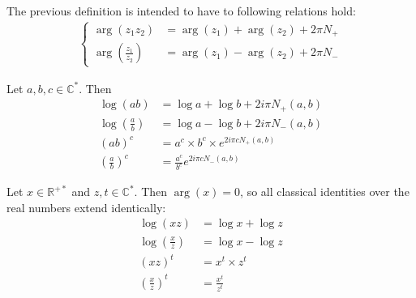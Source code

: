 \documentclass[../main.tex]{subfiles}
\begin{document}
\begin{remark}
	The previous definition is intended to have to following relations hold:
	\begin{align*}
	\begin{cases}
	\arg(z_1 z_2) &= \arg (z_1) + \arg (z_2) + 2\pi N_+\\
	\arg \left(\frac{z_1}{z_2}\right) &= \arg (z_1) - \arg (z_2) + 2\pi N_-
	\end{cases}
	\end{align*}
\end{remark}

\begin{thm}{}
	Let $a, b, c \in \mathbb{C}^*$. Then
	\begin{align*}
		\log (a b) &= \log a + \log b + 2 i \pi N_+ (a, b)\\
		\log \left(\frac{a}{b}\right) &=  \log a - \log b + 2 i \pi N_- (a, b)\\
		{(a b)}^c &= a^c \times b^c \times e^{2i\pi c N_+(a, b)}\\
		{\left(\frac{a}{b}\right)}^c &= \frac{a^c}{b^c} e^{2i\pi c N_-(a, b)}
	\end{align*}
\end{thm}

\begin{cor}{}\label{cor_log_identities}
	Let $x \in \mathbb{R}^{+*}$ and $z,t \in \mathbb{C}^*$. Then $\arg(x) = 0$, so all classical identities over the real numbers extend identically:
	\begin{align*}
	\log (xz) &= \log x + \log z\\
	\log \left(\frac{x}{z}\right) &=  \log x - \log z\\
	{(x z)}^t &= x^t \times z^t\\
	{\left(\frac{x}{z}\right)}^t &= \frac{x^t}{z^t}
	\end{align*}
\end{cor}

%
%	
%
%	
%	
%
\end{document}
